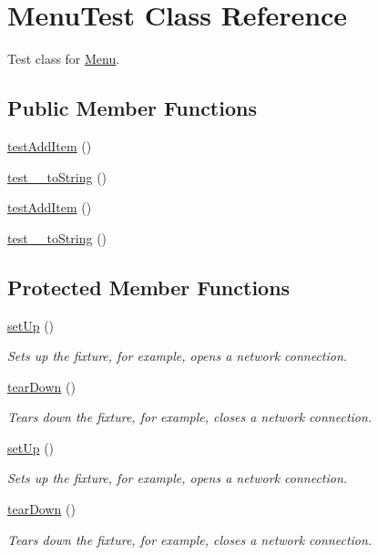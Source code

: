 \hypertarget{class_menu_test}{
\section{MenuTest Class Reference}
\label{class_menu_test}
}


Test class for \hyperlink{class_menu}{Menu}.  


\subsection*{Public Member Functions}
\begin{DoxyCompactItemize}
\item 
\hyperlink{class_menu_test_a780693599e285887826861c507d8757b}{testAddItem} ()
\item 
\hyperlink{class_menu_test_a6d0f97b8cfe33cdfa065e66813b577d2}{test\_\-\_\-toString} ()
\item 
\hyperlink{class_menu_test_a780693599e285887826861c507d8757b}{testAddItem} ()
\item 
\hyperlink{class_menu_test_a6d0f97b8cfe33cdfa065e66813b577d2}{test\_\-\_\-toString} ()
\end{DoxyCompactItemize}
\subsection*{Protected Member Functions}
\begin{DoxyCompactItemize}
\item 
\hyperlink{class_menu_test_af51f8970bf20c1b9e9af65903b899dc9}{setUp} ()
\begin{DoxyCompactList}\small\item\em Sets up the fixture, for example, opens a network connection. \item\end{DoxyCompactList}\item 
\hyperlink{class_menu_test_a1107ffa5b546c5ba8733c555f246b9a6}{tearDown} ()
\begin{DoxyCompactList}\small\item\em Tears down the fixture, for example, closes a network connection. \item\end{DoxyCompactList}\item 
\hyperlink{class_menu_test_af51f8970bf20c1b9e9af65903b899dc9}{setUp} ()
\begin{DoxyCompactList}\small\item\em Sets up the fixture, for example, opens a network connection. \item\end{DoxyCompactList}\item 
\hyperlink{class_menu_test_a1107ffa5b546c5ba8733c555f246b9a6}{tearDown} ()
\begin{DoxyCompactList}\small\item\em Tears down the fixture, for example, closes a network connection. \item\end{DoxyCompactList}\end{DoxyCompactItemize}
